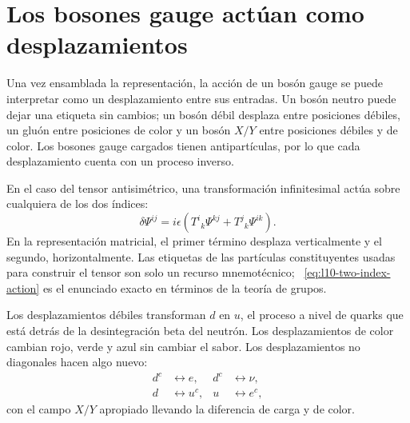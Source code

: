 \section{Los bosones gauge actúan como desplazamientos}

Una vez ensamblada la representación, la acción de un bosón gauge se puede interpretar como un desplazamiento entre sus entradas. Un bosón neutro puede dejar una etiqueta sin cambios; un bosón débil desplaza entre posiciones débiles, un gluón entre posiciones de color y un bosón \(X/Y\) entre posiciones débiles y de color. Los bosones gauge cargados tienen antipartículas, por lo que cada desplazamiento cuenta con un proceso inverso.

En el caso del tensor antisimétrico, una transformación infinitesimal actúa sobre cualquiera de los dos índices:
\begin{equation}
\delta\Psi^{ij}
=
i\epsilon
\left(
T^i{}_k\Psi^{kj}
+
T^j{}_k\Psi^{ik}
\right).
\label{eq:l10-two-index-action}
\end{equation}
En la representación matricial, el primer término desplaza verticalmente y el segundo, horizontalmente. Las etiquetas de las partículas constituyentes usadas para construir el tensor son solo un recurso mnemotécnico; ~\eqref{eq:l10-two-index-action} es el enunciado exacto en términos de la teoría de grupos.

Los desplazamientos débiles transforman \(d\) en \(u\), el proceso a nivel de quarks que está detrás de la desintegración beta del neutrón. Los desplazamientos de color cambian rojo, verde y azul sin cambiar el sabor. Los desplazamientos no diagonales hacen algo nuevo:
\begin{equation}
\begin{aligned}
d^c&\longleftrightarrow e,
& d^c&\longleftrightarrow\nu,\\
d&\longleftrightarrow u^c,
& u&\longleftrightarrow e^c,
\end{aligned}
\label{eq:l10-leptoquark-shifts}
\end{equation}
con el campo \(X/Y\) apropiado llevando la diferencia de carga y de color.

\begin{classroomqa}
\end{classroomqa}

